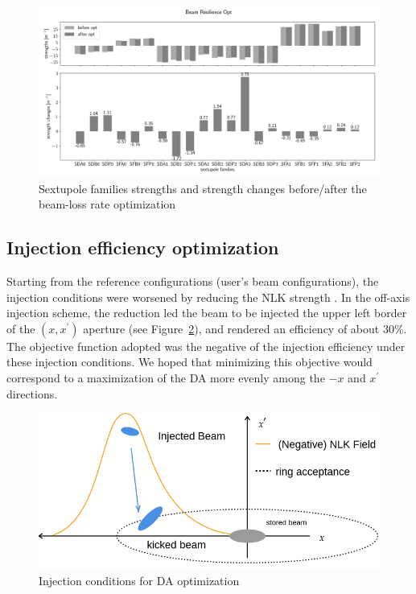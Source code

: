 \documentclass[a4paper,11pt]{article}
\begin{document}
\begin{figure}[t]
    \centering
    \includegraphics*[width=\textwidth]{beam_loss_sexts.png}
    \caption{Sextupole families strengths and strength changes before/after the beam-loss rate optimization}
    \label{beam_loss_sexts}
\end{figure}

\subsection{Injection efficiency optimization}
Starting from the reference configurations (user's beam configurations), the injection conditions were worsened by reducing the NLK strength
. In the off-axis injection scheme, the reduction led the beam to be injected the upper left border of the  $(x,x^\prime)$ aperture (see Figure~\ref{fig:inj_cond}), and rendered an efficiency of about 30\%. The objective function adopted was the negative of the injection efficiency under these injection conditions. We hoped that minimizing this objective would correspond to a maximization of the DA more evenly among the $-x$ and $x^{\prime}$ directions.
\begin{figure}[h]
    \centering
    \includegraphics[width=0.7\columnwidth]{inj_cond.png}
    \caption{Injection conditions for DA optimization}
    \label{fig:inj_cond}
\end{figure}
\end{document}
